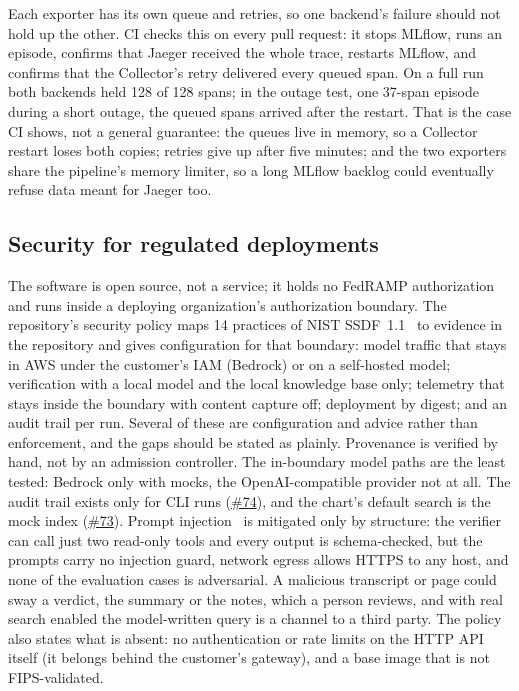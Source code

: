 \documentclass[11pt]{article}
\newcommand{\gh}[1]{\href{https://github.com/Organized-AI/podcast-agent/issues/#1}{\##1}}
\begin{document}
Each exporter has its own queue and retries, so one backend's failure should not hold up the other. CI checks this on every pull request: it stops MLflow, runs an episode, confirms that Jaeger received the whole trace, restarts MLflow, and confirms that the Collector's retry delivered every queued span. On a full run both backends held 128 of 128 spans; in the outage test, one 37-span episode during a short outage, the queued spans arrived after the restart. That is the case CI shows, not a general guarantee: the queues live in memory, so a Collector restart loses both copies; retries give up after five minutes; and the two exporters share the pipeline's memory limiter, so a long MLflow backlog could eventually refuse data meant for Jaeger too.

\subsection{Security for regulated deployments}
The software is open source, not a service; it holds no FedRAMP authorization and runs inside a deploying organization's authorization boundary. The repository's security policy maps 14 practices of NIST SSDF~1.1~\citep{nist2022ssdf} to evidence in the repository and gives configuration for that boundary: model traffic that stays in AWS under the customer's IAM (Bedrock) or on a self-hosted model; verification with a local model and the local knowledge base only; telemetry that stays inside the boundary with content capture off; deployment by digest; and an audit trail per run. Several of these are configuration and advice rather than enforcement, and the gaps should be stated as plainly. Provenance is verified by hand, not by an admission controller. The in-boundary model paths are the least tested: Bedrock only with mocks, the OpenAI-compatible provider not at all. The audit trail exists only for CLI runs (\gh{74}), and the chart's default search is the mock index (\gh{73}). Prompt injection~\citep{greshake2023,owasp2025llm} is mitigated only by structure: the verifier can call just two read-only tools and every output is schema-checked, but the prompts carry no injection guard, network egress allows HTTPS to any host, and none of the evaluation cases is adversarial. A malicious transcript or page could sway a verdict, the summary or the notes, which a person reviews, and with real search enabled the model-written query is a channel to a third party. The policy also states what is absent: no authentication or rate limits on the HTTP API itself (it belongs behind the customer's gateway), and a base image that is not FIPS-validated.
\end{document}
